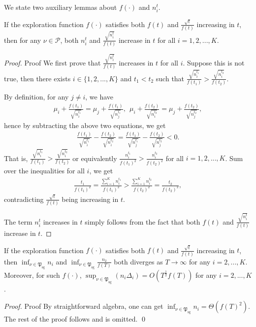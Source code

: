 \documentclass[nonblindrev]{informs3_noinforms}
\begin{document}
We state two auxiliary lemmas about $f(\cdot)$ and $n_i^t$.
\begin{lemma}\label{lem:key_ft_property}
    If the exploration function $f(\cdot)$ satisfies both $f(t)$ and $\frac{\sqrt{t}}{f(t)}$ increasing in $t$, then for any $\nu\in\mathcal P$, both $n_i^t$ and $\frac{\sqrt{n_i^t}}{f(t)}$ increase in $t$ for all $i=1,2,...,K$.
\end{lemma}
\begin{proof}{Proof}
    We first prove that $\frac{\sqrt{n_i^t}}{f(t)}$ increases in $t$ for all $i$. Suppose this is not true, then there exists $i\in\{1,2,...,K\}$ and $t_1<t_2$ such that $\frac{\sqrt{n_i^{t_1}}}{f(t_1)}>\frac{\sqrt{n_i^{t_2}}}{f(t_2)}$.
    
    By definition, for any $j\neq i$, we have
    \begin{align*}
        \mu_i+\frac{f(t_1)}{\sqrt{n_i^{t_1}}}=\mu_j+\frac{f(t_1)}{\sqrt{n_j^{t_1}}}, \ \ \mu_i+\frac{f(t_2)}{\sqrt{n_i^{t_2}}}=\mu_j+\frac{f(t_2)}{\sqrt{n_j^{t_2}}},
    \end{align*}
    hence by subtracting the above two equations, we get
    \begin{align*}
        \frac{f(t_1)}{\sqrt{n_i^{t_1}}}-\frac{f(t_2)}{\sqrt{n_i^{t_2}}}=\frac{f(t_1)}{\sqrt{n_j^{t_1}}}-\frac{f(t_2)}{\sqrt{n_j^{t_2}}}<0.
    \end{align*}
    That is, $\frac{\sqrt{n_i^{t_1}}}{f(t_1)}>\frac{\sqrt{n_i^{t_2}}}{f(t_2)}$ or equivalently $\frac{n_i^{t_1}}{f(t_1)^2}>\frac{n_i^{t_2}}{f(t_2)^2}$ for all $i=1,2,...,K$. Sum over the inequalities for all $i$, we get
    \begin{align*}
        \frac{t_1}{f(t_1)^2}=\frac{\sum_{i=1}^Kn_i^{t_1}}{f(t_1)^2}>\frac{\sum_{i=1}^Kn_i^{t_2}}{f(t_2)^2}=\frac{t_2}{f(t_2)^2},
    \end{align*}
    contradicting $\frac{\sqrt{t}}{f(t)}$ being increasing in $t$.

    The term $n_i^t$ increases in $t$ simply follows from the fact that both $f(t)$ and $\frac{\sqrt{n_i^t}}{f(t)}$ increase in $t$.
\end{proof}

\begin{lemma}\label{lem:n_i_asymptotics}
 If the exploration function $f(\cdot)$ satisfies both $f(t)$ and $\frac{\sqrt{t}}{f(t)}$ increasing in $t$, then $\inf_{\nu\in\mathfrak{P}_{\text{sg}}}n_i$ and $\inf_{\nu\in\mathfrak{P}_{\text{sg}}}\frac{n_2}{f(T)}$ both diverges as $T \to \infty$ for any $i=2,...,K$. Moreover, for such $f(\cdot)$, $\sup_{\nu\in\mathfrak{P}_{\text{sg}}}(n_i\Delta_i)=O\left(T^{\frac{1}{2}}f(T)\right)$ for any $i=2,...,K$. 
\end{lemma}
\begin{proof}{Proof}
    By straightforward algebra, one can get $\inf_{\nu\in\mathfrak{P}_{\text{sg}}}n_i=\Theta(f(T)^2).$  The rest of the proof follows and is omitted. \qed
\end{proof}
\end{document}
